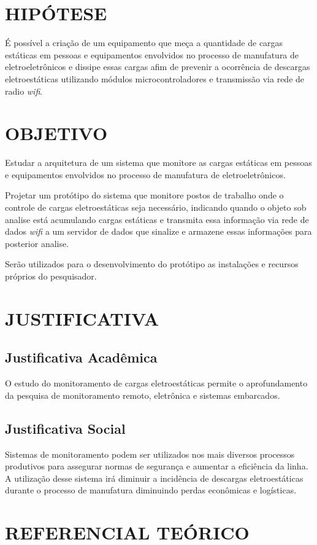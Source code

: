 \documentclass[
	12pt,				%
	openright,			%
	oneside,			%
	a4paper,			%
	chapter=TITLE,		%
	english,			%
	french,				%
	spanish,			%
	brazil,				%
	article,			%
	]{uea-abntex2}
\begin{document}
\section{HIPÓTESE}
É possível a criação de um equipamento que meça a quantidade de cargas estáticas em pessoas e equipamentos envolvidos no processo de manufatura de eletroeletrônicos e dissipe essas cargas afim de prevenir a ocorrência de descargas eletroestáticas utilizando módulos microcontroladores e transmissão via rede de radio \textit{wifi}. 
\section{OBJETIVO}
Estudar a arquitetura de um sistema que monitore as cargas estáticas em pessoas e equipamentos envolvidos no processo de manufatura de eletroeletrônicos.

Projetar um protótipo do sistema que monitore postos de trabalho onde o controle de cargas eletroestáticas seja necessário, indicando quando o objeto sob analise está acumulando cargas estáticas e transmita essa informação via rede de dados \textit{wifi} a um servidor de dados que sinalize e armazene essas informações para posterior analise.

Serão utilizados para o desenvolvimento do protótipo as instalações e recursos próprios do pesquisador.
\section{JUSTIFICATIVA}

\subsection{Justificativa Acadêmica}
O estudo do monitoramento de cargas eletroestáticas permite o aprofundamento da pesquisa de monitoramento remoto, eletrônica e sistemas embarcados.
\subsection{Justificativa Social}
Sistemas de monitoramento podem ser utilizados nos mais diversos processos produtivos para assegurar normas de segurança e aumentar a eficiência da linha.
A utilização desse sistema irá diminuir a incidência de descargas eletroestáticas durante o processo de manufatura diminuindo perdas econômicas e logísticas.
\section{REFERENCIAL TEÓRICO}
\end{document}
